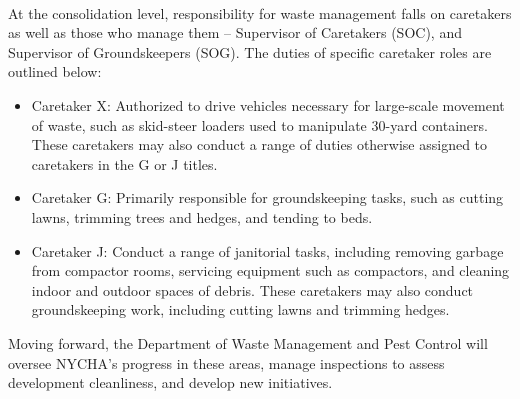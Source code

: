 \\\bigskip At the consolidation level, responsibility for waste management falls on caretakers as well as those who manage them -- Supervisor of Caretakers (SOC), and Supervisor of Groundskeepers (SOG). The duties of specific caretaker roles are outlined below:
\begin{itemize}[noitemsep]
\item Caretaker X: Authorized to drive vehicles necessary for large-scale movement of waste, such as skid-steer loaders used to manipulate 30-yard containers. These caretakers may also conduct a range of duties otherwise assigned to caretakers in the G or J titles. 
\item Caretaker G: Primarily responsible for groundskeeping tasks, such as cutting lawns, trimming trees and hedges, and tending to beds. 
\item Caretaker J: Conduct a range of janitorial tasks, including removing garbage from compactor rooms, servicing equipment such as compactors, and cleaning indoor and outdoor spaces of debris. These caretakers may also conduct groundskeeping work, including cutting lawns and trimming hedges.
\end{itemize}
Moving forward, the Department of Waste Management and Pest Control will oversee NYCHA's progress in these areas, manage inspections to assess development cleanliness, and develop new initiatives.